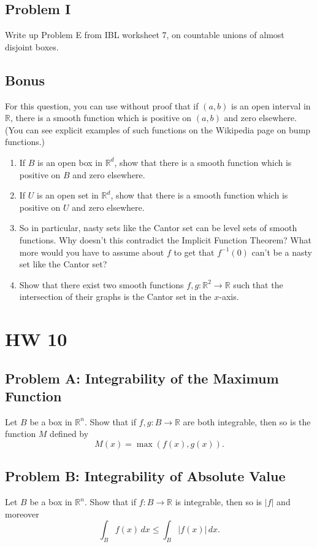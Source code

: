 \documentclass[lang=cn,11pt]{template}
\begin{document}
\section*{Problem I}
Write up Problem E from IBL worksheet 7, on countable unions of almost disjoint boxes.

\section*{Bonus}
For this question, you can use without proof that if $(a, b)$ is an open interval in $\mathbb{R}$, there is a smooth function which is positive on $(a, b)$ and zero elsewhere. (You can see explicit examples of such functions on the Wikipedia page on bump functions.)
\begin{enumerate}
    \item If $B$ is an open box in $\mathbb{R}^d$, show that there is a smooth function which is positive on $B$ and zero elsewhere.
    \item If $U$ is an open set in $\mathbb{R}^d$, show that there is a smooth function which is positive on $U$ and zero elsewhere.
    \item So in particular, nasty sets like the Cantor set can be level sets of smooth functions. Why doesn’t this contradict the Implicit Function Theorem? What more would you have to assume about $f$ to get that $f^{-1}(0)$ can’t be a nasty set like the Cantor set?
    \item Show that there exist two smooth functions $f, g : \mathbb{R}^2 \to \mathbb{R}$ such that the intersection of their graphs is the Cantor set in the $x$-axis.
\end{enumerate}




\chapter{HW 10}

\section*{Problem A: Integrability of the Maximum Function}
Let \( B \) be a box in \( \mathbb{R}^n \). Show that if \( f, g : B \rightarrow \mathbb{R} \) are both integrable, then so is the function \( M \) defined by
\[
M(x) = \max(f(x), g(x)).
\]

\section*{Problem B: Integrability of Absolute Value}
Let \( B \) be a box in \( \mathbb{R}^n \). Show that if \( f : B \rightarrow \mathbb{R} \) is integrable, then so is \( |f| \) and moreover
\[
\int_B f(x) \, dx \leq \int_B |f(x)| \, dx.
\]
\end{document}

